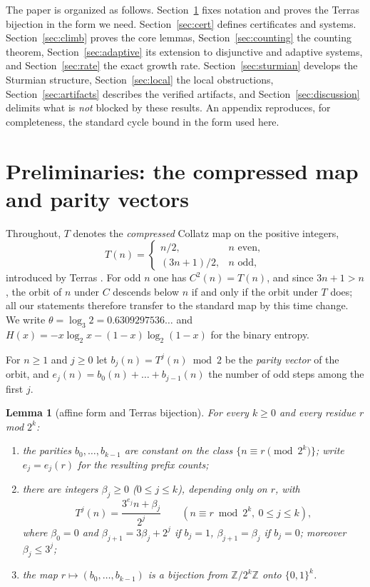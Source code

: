 \documentclass[11pt]{article}
\newtheorem{lemma}[theorem]{Lemma}
\theoremstyle{definition}
\newcommand{\Z}{\mathbb{Z}}
\begin{document}
The paper is organized as follows. Section~\ref{sec:prelim} fixes notation
and proves the Terras bijection in the form we need.
Section~\ref{sec:cert} defines certificates and systems.
Section~\ref{sec:climb} proves the core lemmas, Section~\ref{sec:counting}
the counting theorem, Section~\ref{sec:adaptive} its extension to
disjunctive and adaptive systems, and Section~\ref{sec:rate} the exact
growth rate.
Section~\ref{sec:sturmian} develops the Sturmian structure,
Section~\ref{sec:local} the local obstructions,
Section~\ref{sec:artifacts} describes the verified artifacts, and
Section~\ref{sec:discussion} delimits what is \emph{not} blocked by these
results. An appendix reproduces, for completeness, the standard cycle
bound in the form used here.

\section{Preliminaries: the compressed map and parity vectors}\label{sec:prelim}

Throughout, $T$ denotes the \emph{compressed} Collatz map on the positive
integers,
\[
T(n)=\begin{cases} n/2, & n \text{ even},\\[2pt] (3n+1)/2, & n \text{ odd},\end{cases}
\]
introduced by Terras \cite{Terras1976}. For odd $n$ one has $C^2(n)=T(n)$,
and since $3n+1>n$, the orbit of $n$ under $C$ descends below $n$ if and
only if the orbit under $T$ does; all our statements therefore transfer to
the standard map by this time change. We write
$\theta=\log_3 2 = 0.6309297536\ldots$ and
$H(x)=-x\log_2 x-(1-x)\log_2(1-x)$ for the binary entropy.

For $n\ge 1$ and $j\ge 0$ let $b_j(n)=T^j(n)\bmod 2$ be the \emph{parity
vector} of the orbit, and $e_j(n)=b_0(n)+\dots+b_{j-1}(n)$ the number of odd
steps among the first $j$.

\begin{lemma}[affine form and Terras bijection]\label{lem:terras}
For every $k\ge 0$ and every residue $r$ mod $2^k$:
\begin{enumerate}
\item[(a)] the parities $b_0,\dots,b_{k-1}$ are constant on the class
  $\{n\equiv r \pmod{2^k}\}$; write $e_j=e_j(r)$ for the resulting prefix
  counts;
\item[(b)] there are integers $\beta_j\ge 0$ ($0\le j\le k$), depending only
  on $r$, with
  \[
  T^j(n)=\frac{3^{e_j} n+\beta_j}{2^j} \qquad (n\equiv r \bmod 2^k,\ 0\le j\le k),
  \]
  where $\beta_0=0$ and $\beta_{j+1}=3\beta_j+2^j$ if $b_j=1$,
  $\beta_{j+1}=\beta_j$ if $b_j=0$; moreover $\beta_j\le 3^j$;
\item[(c)] the map $r\mapsto (b_0,\dots,b_{k-1})$ is a bijection from
  $\Z/2^k\Z$ onto $\{0,1\}^k$.
\end{enumerate}
\end{lemma}
\end{document}
